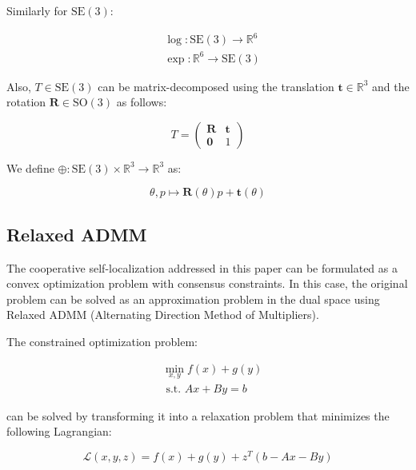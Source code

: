 \documentclass[a4paper,fleqn,10pt,twocolumn]{SICE_ISCS}
\begin{document}
Similarly for $\mathrm{SE}(3)$:

\begin{equation}
\begin{aligned}
& \log : \mathrm{SE}(3) \rightarrow \mathbb{R}^{6} \\
& \exp : \mathbb{R}^{6} \rightarrow \mathrm{SE}(3)
\end{aligned}
\end{equation}

Also, $T \in \mathrm{SE}(3)$ can be matrix-decomposed using the translation $\mathbf{t} \in \mathbb{R}^{3}$ and the rotation $\mathbf{R} \in \mathrm{SO}(3)$ as follows:

\begin{equation}
T=\left(\begin{array}{c|c}
\mathbf{R} & \mathbf{t} \\
\hline \mathbf{0} & 1
\end{array}\right)
\end{equation}

We define $\oplus: \mathrm{SE}(3) \times \mathbb{R}^{3} \rightarrow \mathbb{R}^{3}$ as:

\begin{equation}
\theta, p \mapsto \mathbf{R}(\theta) p+\mathbf{t}(\theta)
\end{equation}

\subsection{Relaxed ADMM}
The cooperative self-localization addressed in this paper can be formulated as a convex optimization problem with consensus constraints. In this case, the original problem can be solved as an approximation problem in the dual space using Relaxed ADMM (Alternating Direction Method of Multipliers)\cite{ADMM}.

The constrained optimization problem:

\begin{equation}
\begin{aligned}
& \min _{x, y} f(x)+g(y) \\
& \text { s.t. } A x+B y=b
\end{aligned}
\end{equation}

can be solved by transforming it into a relaxation problem that minimizes the following Lagrangian:

\begin{equation}
\mathcal{L}(x, y, z)=f(x)+g(y)+z^{T}(b-A x-B y)
\end{equation}
\end{document}

